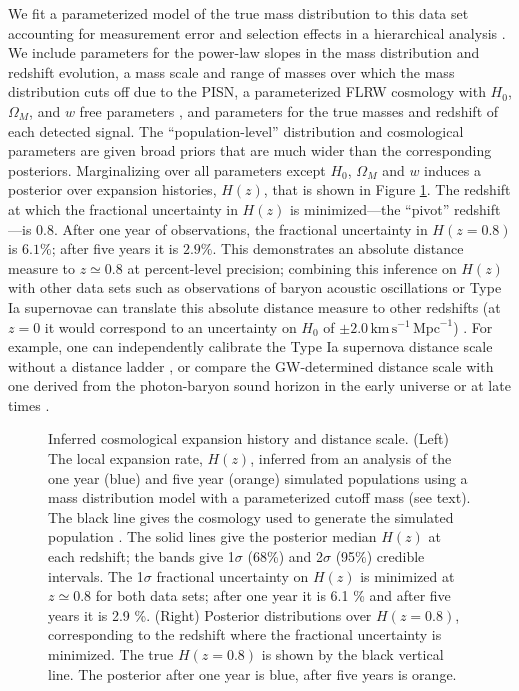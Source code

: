 \documentclass[modern]{aastex62}
\newcommand{\SigmaHPvtOneYear}{6.1 \%}
\newcommand{\SigmaHPvtFiveYear}{2.9 \%}
\newcommand{\SigmaHNaughtTransFiveYear}{2.0}
\newcommand{\zpivot}{0.8}
\newcommand{\kmsMpc}{\mathrm{km} \, \mathrm{s}^{-1} \, \mathrm{Mpc}^{-1}}
\begin{document}
We fit a parameterized model of the true mass distribution to this data set
accounting for measurement error and selection effects in a hierarchical
analysis \citep{Hogg2010,Mandel2010,Loredo2004,Mandel2019,Farr2019}.  We include
parameters for the power-law slopes in the mass distribution and redshift
evolution, a mass scale and range of masses over which the mass distribution
cuts off due to the \ac{PISN}, a parameterized FLRW cosmology with $H_0$,
$\Omega_M$, and $w$ free parameters \citep{Hogg1999}, and parameters for the
true masses and redshift of each detected signal.  The ``population-level''
distribution and cosmological parameters are given broad priors that are much
wider than the corresponding posteriors.  Marginalizing over all parameters
except $H_0$, $\Omega_M$ and $w$ induces a posterior over expansion histories,
$H(z)$, that is shown in Figure \ref{fig:Hz}.  The redshift at which the
fractional uncertainty in $H(z)$ is minimized---the ``pivot'' redshift---is
$\zpivot{}$.  After one year of observations, the fractional uncertainty in $H(z
= \zpivot)$ is $\SigmaHPvtOneYear{}$; after five years it is
$\SigmaHPvtFiveYear{}$.  This demonstrates an absolute distance measure to $z
\simeq \zpivot{}$ at percent-level precision; combining this inference on $H(z)$
with other data sets such as observations of baryon acoustic oscillations
\citep{BOSS2015} or Type Ia supernovae \citep{Scolnic2018} can translate this
absolute distance measure to other redshifts (at $z = 0$ it would correspond to
an uncertainty on $H_0$ of $\pm \SigmaHNaughtTransFiveYear{} \, \kmsMpc$)
\citep{BOSS2015,Cuesta2015,Feeney2019}. For example, one can independently
calibrate the Type Ia supernova distance scale without a distance ladder
\citep{Feeney2019,Scolnic2018}, or compare the \ac{GW}-determined distance scale
with one derived from the photon-baryon sound horizon
\citep{Cuesta2015,Aylor2019} in the early universe \citep{Planck2016} or at late
times \citep{BOSS2015}.

\begin{figure}
%
  \caption{\label{fig:Hz} Inferred cosmological expansion history and distance
  scale.  (Left) The local expansion rate, $H(z)$, inferred from an analysis of
  the one year (blue) and five year (orange) simulated populations using a mass
  distribution model with a parameterized cutoff mass (see text).  The black
  line gives the cosmology used to generate the simulated population \citep[TT,
  TE, EE + lowP + lensing + ext]{Planck2016}.  The solid lines give the
  posterior median $H(z)$ at each redshift; the bands give 1$\sigma$ (68\%) and
  2$\sigma$ (95\%) credible intervals.  The 1$\sigma$ fractional uncertainty on
  $H(z)$ is minimized at $z \simeq \zpivot{}$ for both data sets; after one year
  it is \SigmaHPvtOneYear{} and after five years it is \SigmaHPvtFiveYear{}.
  (Right) Posterior distributions over $H\left(z = \zpivot{}\right)$,
  corresponding to the redshift where the fractional uncertainty is minimized.
  The true $H\left( z = \zpivot{} \right)$ is shown by the black vertical line.
  The posterior after one year is blue, after five years is orange. }
%
\end{figure}
\end{document}
